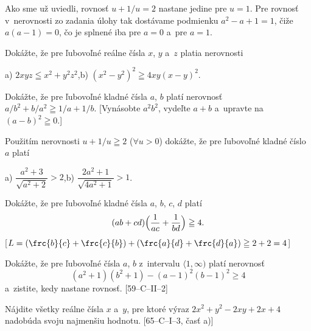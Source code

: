 {Ako sme už uviedli, rovnosť $u+1/u=2$ nastane jedine pre $u=1$.
Pre rovnosť v~nerovnosti zo zadania úlohy tak dostávame podmienku
$a^2-a+1=1$, čiže $a(a-1)=0$, čo je splnené iba
pre $a=0$ a~pre $a=1$.




Dokážte, že pre ľubovoľné reálne čísla $x$, $y$ a~$z$ platia
nerovnosti
\item{a)} $2xyz\leqq x^2+y^2z^2$,\quad b) $(x^2-y^2)^2\geqq 4xy(x-y)^2$.
\endgraf
[a) $P-L=(x-yz)^2$, b) $L-P=(x-y)^4$]

Dokážte, že pre ľubovoľné kladné čísla $a$, $b$
platí nerovnosť $a/b^2+b/a^2\geqq 1/a+1/b$.
[Vynásobte $a^2b^2$, vydeľte $a+b$ a~upravte na $(a-b)^2\geqq0$.]

\D
Použitím nerovnosti $u+1/u\geqq2$ ($\forall u>0$) dokážte, že pre
ľubovoľné kladné číslo $a$ platí
\item{a)} $\dfrac{a^2+3}{\sqrt{a^2+2}}>2$,\quad b) $\dfrac{2a^2+1}{\sqrt{4a^2+1}}>1$.
\endgraf
[Voľte $u=\sqrt{a^2+2}$ v~prípade~a), $u=\sqrt{4a^2+1}$
v~prípade~b) a~v~oboch prípadoch využite, že $u\ne1$.]

Dokážte, že pre ľubovoľné kladné čísla $a$, $b$, $c$,
$d$ platí $$(ab+cd)\Bigl(\frac1{ac}+\frac1{bd}\Bigr)\geqq4.$$
[$L=\left(\frc{b}{c}+\frc{c}{b}\right)+
\left(\frc{a}{d}+\frc{d}{a}\right)\geqq2+2=4$]

Dokážte, že pre ľubovoľné čísla $a$, $b$ z~intervalu $\langle 1,\infty)$
platí nerovnosť
$$
(a^2+1)(b^2+1) - (a-1)^2 (b-1)^2 \ge 4
$$
a~zistite, kedy nastane rovnosť.
[59--C--II--2]

Nájdite všetky reálne čísla $x$ a~$y$, pre ktoré výraz
$2x^2+y^2-2xy+2x+4$ nadobúda svoju
najmenšiu hodnotu. [65--C--I--3, časť a)]
}

